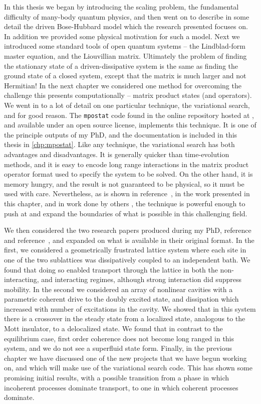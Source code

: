 In this thesis we began by introducing the scaling problem, the fundamental difficulty of many-body quantum physics, and then went on to describe in some detail the driven Bose-Hubbard model which the research presented focuses on. In addition we provided some physical motivation for such a model. Next we introduced some standard tools of open quantum systems -- the Lindblad-form master equation, and the Liouvillian matrix. Ultimately the problem of finding the stationary state of a driven-dissipative system is the same as finding the ground state of a closed system, except that the matrix is much larger and not Hermitian! In the next chapter we considered one method for overcoming the challenge this presents computationally -- matrix product states (and operators). We went in to a lot of detail on one particular technique, the variational search, and for good reason. The \lstinline$mpostat$ code found in the online repository hosted at \cite{otb:gitVSSS}, and available under an open source license, implements this technique. It is one of the principle outputs of my PhD, and the documentation is included in this thesis in \cref{chp:mpostat}. Like any technique, the variational search has both advantages and disadvantages. It is generally quicker than time-evolution methods, and it is easy to encode long range interactions in the matrix product operator format used to specify the system to be solved. On the other hand, it is memory hungry, and the result is not guaranteed to be physical, so it must be used with care. Nevertheless, as is shown in reference~\cite{Owen2017}, in the work presented in this chapter, and in work done by others \cite{Cui2015,Mascarenhas2015}, the technique is powerful enough to push at and expand the boundaries of what is possible in this challenging field.

We then considered the two research papers produced during my PhD, reference~\cite{Owen2017} and reference~\cite{Brown2018}, and expanded on what is available in their original format. In the first, we considered a geometrically frustrated lattice system where each site in one of the two sublattices was dissipatively coupled to an independent bath. We found that doing so enabled transport through the lattice in both the non-interacting, and interacting regimes, although strong interaction did suppress mobility. In the second we considered an array of nonlinear cavities with a parametric coherent drive to the doubly excited state, and dissipation which increased with number of excitations in the cavity. We showed that in this system there is a crossover in the steady state from a localized state, analogous to the Mott insulator, to a delocalized state. We found that in contrast to the equilibrium case, first order coherence does not become long ranged in this system, and we do not see a superfluid state form. Finally, in the previous chapter we have discussed one of the new projects that we have begun working on, and which will make use of the variational search code. This has shown some promising initial results, with a possible transition from a phase in which incoherent processes dominate transport, to one in which coherent processes dominate.

